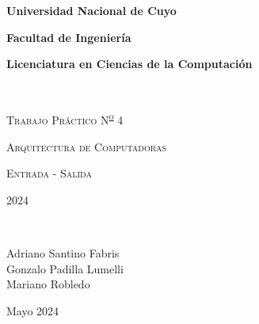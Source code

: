 {\centering
    {\bfseries\Large Universidad Nacional de Cuyo \par}
    \vspace{-0.2cm}
    {\bfseries\Large Facultad de Ingeniería \par}
    \vspace{-0.2cm}
    {\bfseries\Large Licenciatura en Ciencias de la Computación \par}
    \pagestyle{plain}
    \vfill
    \noindent\hrulefill \\
    {\scshape\Huge Trabajo Práctico N\textsuperscript{\Large\underline o} 4\par} %
    \vspace{0.5cm}
    {\scshape\Large Arquitectura de Computadoras \par}
    {\scshape\large Entrada - Salida \par}
    \vspace{0.5cm}
    {\scshape\Large 2024 \par} %
    \noindent\hrulefill \\
    \vspace{4cm}
    {\Large
    Adriano Santino Fabris\\
    Gonzalo Padilla Lumelli\\
    Mariano Robledo
    \par}
    {\large Mayo 2024 \par} %
    \vfill
    \setcounter{page}{1}
    \newpage
}